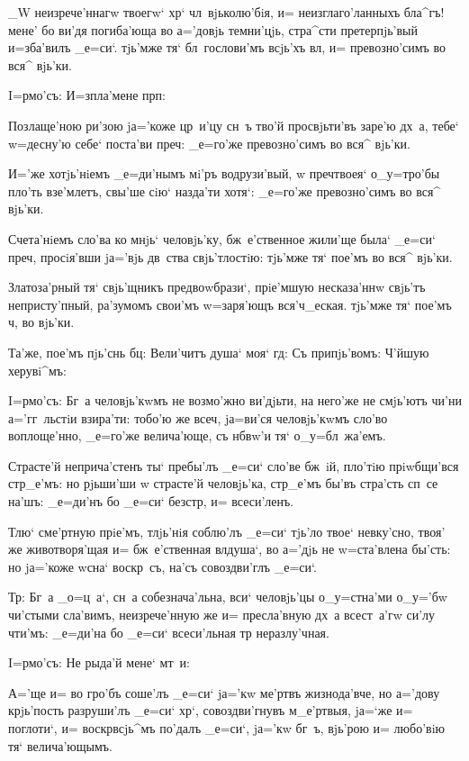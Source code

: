 _W неизрече'ннагw твоегw` хр` чл~вjьколю'бiя, и= 
неизглаго'ланныхъ бла^гъ! мене' бо ви'дя погиба'юща во 
а='довjь темни'цjь, стра^сти претерпjь'вый и=зба'вилъ 
_е=си`. тjь'мже тя` бл~гослови'мъ всjь'хъ вл, и= 
превозно'симъ во вся^ вjь'ки. 

 I=рмо'съ: И=з\ъ пла'мене прп:

Позлаще'ною ри'зою jа='коже цр~и'цу сн~ъ тво'й 
просвjьти'въ заре'ю дх~а, тебе` w=десну'ю себе` поста'ви 
преч: _е=го'же превозно'симъ во вся^ вjь'ки.

И='же хотjь'нiемъ _е=ди'нымъ мi'ръ водрузи'вый, w\т 
преч твоея` о_у=тро'бы пло'ть взе'млетъ, свы'ше сiю` 
назда'ти хотя`: _е=го'же превозно'симъ во вся^ вjь'ки.

Счета'нiемъ сло'ва ко мнjь` человjь'ку, бж~е'ственное 
жили'ще была` _е=си` преч, просiя'вши jа='вjь 
дв~ства свjь'тлостiю: тjь'мже тя` пое'мъ во вся^ вjь'ки.

Златоза'рный тя` свjь'щникъ предвоwбрази`, прiе'мшую 
несказа'ннw свjь'тъ непристу'пный, ра'зумомъ свои'мъ 
w=заря'ющъ вся'ч_еская. тjь'мже тя` пое'мъ ч, во 
вjь'ки.

Та'же, пое'мъ пjь'снь бц: Вели'читъ душа` моя` 
гд: Съ припjь'вомъ: Ч'йшую херувi^мъ:


I=рмо'съ: Бг~а человjь'кwмъ не возмо'жно ви'дjьти, на 
него'же не смjь'ютъ чи'ни а='гг~льстiи взира'ти: тобо'ю 
же всеч, jа=ви'ся человjь'кwмъ сло'во воплоще'нно, 
_е=го'же велича'юще, съ нб вw'и тя` о_у=бл~жа'емъ. 

Страсте'й неприча'стенъ ты` пребы'лъ _е=си` сло'ве 
бж~iй, пло'тiю прiwбщи'вся стр_е'мъ: но рjьши'ши w\т 
страсте'й человjь'ка, стр_е'мъ бы'въ стра'сть сп~се 
на'шъ: _е=ди'нъ бо _е=си` безстр, и= всеси'ленъ.

Тлю` сме'ртную прiе'мъ, тлjь'нiя соблю'лъ _е=си` 
тjь'ло твое` невку'сно, твоя' же животворя'щая и= 
бж~е'ственная вл душа`, во а='дjь не w=ста'влена 
бы'сть: но jа='коже w\т сна` воскр~съ, на'съ совоздви'глъ 
_е=си`.

Тр: Бг~а _о=ц~а`, сн~а собезнача'льна, вси` 
человjь'цы о_у=стна'ми о_у='бw чи'стыми сла'вимъ, 
неизрече'нную же и= пресла'вную дх~а всест~а'гw си'лу 
чти'мъ: _е=ди'на бо _е=си` всеси'льная тр 
неразлу'чная. 

 I=рмо'съ: Не рыда'й мене` мт~и:

А='ще и= во гро'бъ соше'лъ _е=си` jа='кw ме'ртвъ 
жизнода'вче, но а='дову крjь'пость разруши'лъ _е=си` 
хр`, совоздви'гнувъ м_е'ртвыя, jа=`же и= поглоти`, и= 
воскр всjь^мъ по'далъ _е=си`, jа='кw бг~ъ, вjь'рою 
и= любо'вiю тя` велича'ющымъ.

